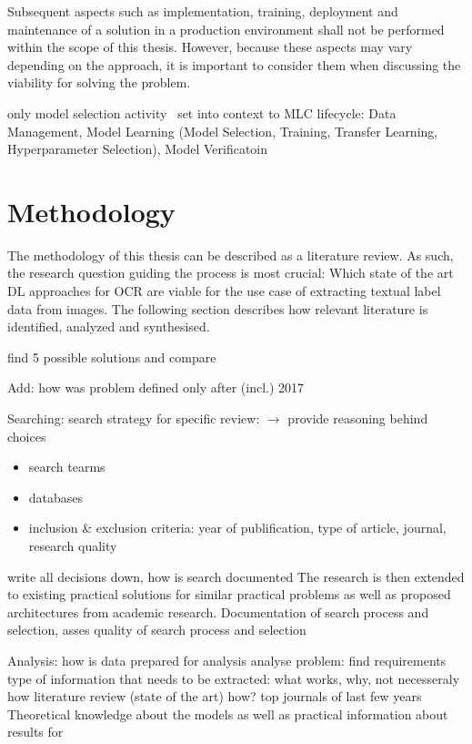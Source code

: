Subsequent aspects such as implementation, training, deployment and maintenance of a solution in a
production environment shall not be performed within the scope of this thesis.
However, because these aspects may vary depending on the approach, it is important to consider them when
discussing the viability for solving the problem.

only model selection activity~\cite{ashmore_assuring_2021}
set into context to MLC lifecycle: Data Management, Model Learning (Model Selection, Training,
Transfer Learning, Hyperparameter Selection), Model Verificatoin

\section{Methodology}\label{se:methodology}
The methodology of this thesis can be described as a literature review.
As such, the research question guiding the process is most crucial: Which state of the art \ac{DL}
approaches for \ac{OCR} are viable for the use case of extracting textual label data from
images.
The following section describes how relevant literature is identified, analyzed and synthesised.

find 5 possible solutions and compare

Add: how was problem defined
only after (incl.) 2017

Searching:
search strategy for specific review: $\rightarrow$ provide reasoning behind choices
\begin{itemize}
    \item search tearms
    \item databases
    \item inclusion \& exclusion criteria: year of publification, type of article, journal, research
        quality
\end{itemize}
write all decisions down, how is search documented
The research is then extended to existing practical solutions for similar practical problems as
well as proposed architectures from academic research.
Documentation of search process and selection, asses quality of search process and selection

Analysis:
how is data prepared for analysis
analyse problem: find requirements
type of information that needs to be extracted: what works, why, not necesseraly how
literature review (state of the art)
how? top journals of last few years
Theoretical knowledge about the models as well as practical information about results for

